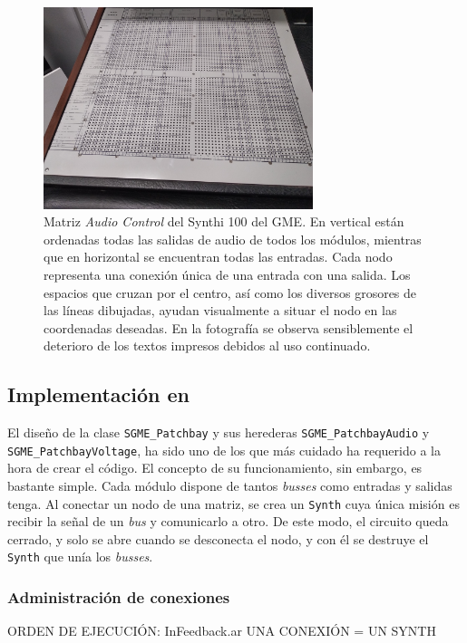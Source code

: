 \begin{figure}
	\centering
	\includegraphics[width=0.7\textwidth]{images/patchbay_audio_vista_gral}
	\caption[Matriz \textit{Audio Control} del Synthi 100 del GME]{Matriz \textit{Audio Control} del Synthi 100 del GME. En vertical están ordenadas todas las salidas de audio de todos los módulos, mientras que en horizontal se encuentran todas las entradas. Cada nodo representa una conexión única de una entrada con una salida. Los espacios que cruzan por el centro, así como los diversos grosores de las líneas dibujadas, ayudan visualmente a situar el nodo en las coordenadas deseadas. En la fotografía se observa sensiblemente el deterioro de los textos impresos debidos al uso continuado.}
	\label{fig:patchbay_audio_vista_gral}
\end{figure}

\subsection{Implementación en \appName}

El diseño de la clase \texttt{SGME\_Patchbay} y sus herederas \texttt{SGME\_PatchbayAudio} y \texttt{SGME\_PatchbayVoltage}, ha sido uno de los que más cuidado ha requerido a la hora de crear el código. El concepto de su funcionamiento, sin embargo, es bastante simple. Cada módulo dispone de tantos \textit{busses} como entradas y salidas tenga. Al conectar un nodo de una matriz, se crea un \texttt{Synth} cuya única misión es recibir la señal de un \textit{bus} y comunicarlo a otro. De este modo, el circuito queda cerrado, y solo se abre cuando se desconecta el nodo, y con él se destruye el \texttt{Synth} que unía los \textit{busses}.

\subsubsection[]{Administración de conexiones}
ORDEN DE EJECUCIÓN: InFeedback.ar
UNA CONEXIÓN = UN SYNTH

